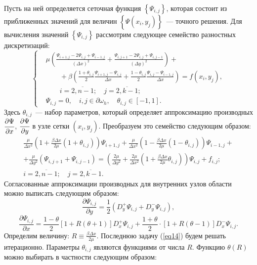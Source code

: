 \documentclass[press]{vestnik}
\begin{document}
Пусть на ней определяется сеточная функция $\left\{ {\Psi_{i,j} } 
\right\}$, которая состоит из приближенных значений для величин $\left\{ 
{\Psi \left( {x_{i} ,y_{j} } \right)} \right\}$~--- точного решения. Для 
вычисления значений $\left\{ {\Psi_{i,j} } \right\}$ рассмотрим следующее 
семейство разностных дискретизаций:
\[
\left\{ \begin{aligned}
&\mu \left( \frac{\Psi_{i+1,j} -2\Psi_{i,j} +\Psi_{i-1,j} }{(\Delta x)^{2}}+\frac{\Psi_{i,j+1} -2\Psi_{i,j} +\Psi_{i,j-1} }{(\Delta y)^{2}} \right)+\\
&\qquad+\beta \left( \frac{1+\theta_{i,j} }{2} \frac{\Psi_{i+1,j} -\Psi_{i,j} }{\Delta x} +\frac{1-\theta_{i,j} }{2} \frac{\Psi_{i,j} -\Psi_{i-1,j} }{\Delta x}\right)=f(x_{i} ,y_{j} ),\\
&\qquad i=\overline {2,n-1} ;\quad j=\overline 
{2,k-1} ; \\ 
&\Psi_{i,j} =0,\quad i,j\in \partial \omega_{h} ,\quad \theta_{i,j} \in 
\left[ {-1,1} \right].
 \end{aligned} \right.
\]
Здесь $\theta_{i,j} $~--- набор параметров, который определяет аппроксимацию 
производных $\cfrac{\partial \Psi }{\partial x}$, $\cfrac{\partial \Psi 
}{\partial y}$ в узле сетки $\left( {x_{i} ,y_{j} } \right)$. Преобразуем 
это семейство следующим образом:
\begin{multline}
\label{eq14}
 \frac{\mu }{\Delta x^{2}} \left( {1+\frac{\beta \Delta x}{2\mu 
}(1+\theta_{i,j} )} \right) \Psi_{i+1,j} +\frac{\mu }{\Delta 
x^{2}} \left( {1-\frac{\beta \Delta x}{2\mu }(1-\theta_{i,j} )} 
\right) \Psi_{i-1,j} +\\
+ \frac{\mu }{\Delta y^{2}}\left( {\Psi_{i,j+1} +\Psi_{i,j-1} } \right)= \left( {\frac{2\mu }{\Delta y^{2}}+\frac{2\mu }{\Delta x^{2}}\left( 
{1+\frac{\beta \Delta x}{2\mu }\theta_{i,j} } \right)} \right) \Psi 
_{i,j} +f_{i,j} ;\\
 i=\overline {2,n-1} ;\quad j=\overline {2,k-1}.
\end{multline}
Согласованные аппроксимации производных для внутренних узлов области можно 
выписать следующим образом:
\begin{equation}
\label{eq15}
\frac{\partial \Psi_{i,j} }{\partial y}=\frac{1}{2}\left( {D_{y}^{+} \Psi 
_{i,j} +D_{y}^{-} \Psi_{i,j} } \right),
\end{equation}
\[
\frac{\partial \Psi_{i,j} }{\partial x}=\frac{1-\theta }{2} \left[ 
{1+R\left( {\theta +1} \right)} \right] D_{x}^{+} \Psi_{i,j} 
+\frac{1+\theta }{2}\cdot \left[ {1+R\left( {\theta -1} \right)} 
\right] D_{x}^{-} \Psi_{i,j} .
\]
Определим величину: $R\equiv \frac{\beta \Delta x}{2\mu }$. Последнюю задачу 
(\ref{eq14}) будем решать итерационно. Параметры $\theta_{i,j} $ являются функциями 
от числа $R$. Функцию $\theta \left( R \right)$ можно выбирать в частности 
следующим образом:
\end{document}
